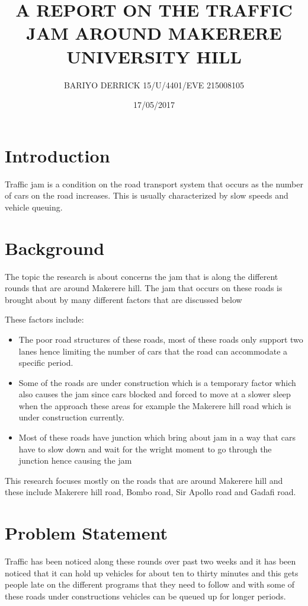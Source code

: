 \documentclass[options]{article}
\begin{document}
\title{A REPORT ON THE TRAFFIC JAM AROUND MAKERERE UNIVERSITY HILL}
\author{
BARIYO DERRICK
15/U/4401/EVE
215008105}
\date{17/05/2017}
\maketitle

\section{\textbf{ Introduction}}
Traffic jam is a condition on the road transport system that occurs as the number of cars on the road increases. This is usually characterized by slow speeds and vehicle queuing. 
\section{\textbf{ Background }}
The topic the research is about concerns the jam that is along the different rounds that are around Makerere hill.
The jam that occurs on these roads is brought about by many different factors that are discussed below 

These factors include:
\begin{itemize}
   \item The poor road structures of these roads, most of these roads only support two lanes hence limiting the number of cars that the road can accommodate a specific period.
   \item  Some of the roads are under construction which is a temporary factor which also causes the jam since cars blocked and forced to move at a slower sleep when the approach these areas for example the Makerere hill road which is under construction currently.
   \item Most of these roads have junction which bring about jam in a way that cars have to slow down and wait for the wright moment to go through the junction hence causing the jam 
\end{itemize}
This research focuses mostly on the roads that are around Makerere hill and these include Makerere hill road, Bombo road, Sir Apollo road and Gadafi road.

\section{\textbf{ Problem Statement}}
Traffic has been noticed along these rounds over past two weeks and it has been noticed that it can hold up vehicles for about ten to thirty minutes and this gets people late on the different programs that they need to follow and with some of these roads under constructions vehicles can be queued up for longer periods.
\end{document}
